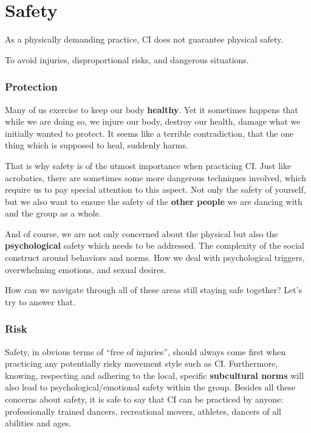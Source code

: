 \chapter{Safety}\label{ch:safety}


As a physically demanding practice, CI does not guarantee physical safety.

To avoid injuries, disproportional risks, and dangerous situations.


\subsection{Protection}\label{subsec:protection}

Many of us exercise to keep our body \textbf{healthy}.
Yet it sometimes happens that while we are doing so, we injure our body, destroy our health, damage what we initially wanted to protect.
It seems like a terrible contradiction, that the one thing which is supposed to heal, suddenly harms.

That is why safety is of the utmost importance when practicing CI\@.
Just like acrobatics, there are sometimes some more dangerous techniques involved, which require us to pay special attention to this aspect.
Not only the safety of yourself, but we also want to ensure the safety of the \textbf{other people} we are dancing with and the group as a whole.

And of course, we are not only concerned about the physical but also the \textbf{psychological} safety which needs to be addressed.
The complexity of the social construct around behaviors and norms.
How we deal with psychological triggers, overwhelming emotions, and sexual desires.

How can we navigate through all of these areas still staying safe together?
Let's try to answer that.

\subsection{Risk}\label{subsec:risk}

Safety, in obvious terms of ``free of injuries'', should always come first when practicing any potentially risky movement style such as CI\@.
Furthermore, knowing, respecting and adhering to the local, specific \textbf{subcultural norms} will also lead to psychological/emotional safety within the group.
Besides all these concerns about safety, it is safe to say that CI can be practiced by anyone: professionally trained dancers, recreational movers, athletes, dancers of all abilities and ages.

